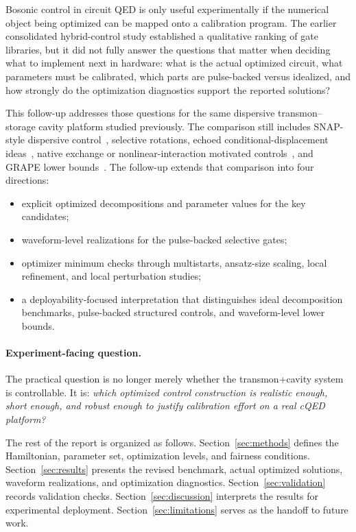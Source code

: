 \documentclass[11pt, a4paper]{article}
\begin{document}
Bosonic control in circuit QED is only useful experimentally if the numerical object being optimized can be mapped onto a calibration program. The earlier consolidated hybrid-control study established a qualitative ranking of gate libraries, but it did not fully answer the questions that matter when deciding what to implement next in hardware: what is the actual optimized circuit, what parameters must be calibrated, which parts are pulse-backed versus idealized, and how strongly do the optimization diagnostics support the reported solutions?

This follow-up addresses those questions for the same dispersive transmon--storage cavity platform studied previously. The comparison still includes SNAP-style dispersive control~\cite{heeres2015snap,krastanov2015universal,heeres2017logical}, selective rotations, echoed conditional-displacement ideas~\cite{eickbusch2022ecd,diringer2024cnod}, native exchange or nonlinear-interaction motivated controls~\cite{wallraff2007sideband,valadares2024transposition,huang2025fastsideband,yang2024nativecubic}, and GRAPE lower bounds~\cite{khaneja2005optimal}. The follow-up extends that comparison into four directions:
\begin{itemize}
\item explicit optimized decompositions and parameter values for the key candidates;
\item waveform-level realizations for the pulse-backed selective gates;
\item optimizer minimum checks through multistarts, ansatz-size scaling, local refinement, and local perturbation studies;
\item a deployability-focused interpretation that distinguishes ideal decomposition benchmarks, pulse-backed structured controls, and waveform-level lower bounds.
\end{itemize}

\paragraph{Experiment-facing question.}
The practical question is no longer merely whether the transmon+cavity system is controllable. It is: \emph{which optimized control construction is realistic enough, short enough, and robust enough to justify calibration effort on a real cQED platform?}

The rest of the report is organized as follows. Section~\ref{sec:methods} defines the Hamiltonian, parameter set, optimization levels, and fairness conditions. Section~\ref{sec:results} presents the revised benchmark, actual optimized solutions, waveform realizations, and optimization diagnostics. Section~\ref{sec:validation} records validation checks. Section~\ref{sec:discussion} interprets the results for experimental deployment. Section~\ref{sec:limitations} serves as the handoff to future work.
\end{document}
